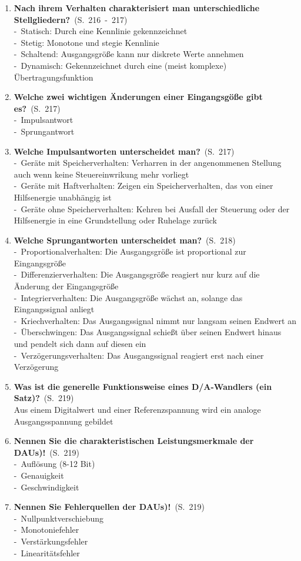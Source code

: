 \documentclass[a4paper,12pt]{article}
\newcommand{\question}[3]{\pagebreak[3]\item {\textbf{#1?}}\ (S.\ #2)#3}
\newcommand{\statement}[3]{\pagebreak[3]\item {\textbf{#1!}}\ (S.\ #2)#3}
\newcommand{\catchword}[1]{\\-\ #1}
\newcommand{\normaltext}[1]{\\#1}
\newcommand{\page}[1]{#1}
\newcommand{\pages}[2]{#1\ -\ #2}
\begin{document}
\begin{enumerate}
  \question{Nach ihrem Verhalten charakterisiert man unterschiedliche Stellgliedern}{\pages{216}{217}}
  {
    \catchword{Statisch: Durch eine Kennlinie gekennzeichnet}
    \catchword{Stetig: Monotone und stegie Kennlinie}
    \catchword{Schaltend: Ausgangsgröße kann nur diskrete Werte annehmen}
    \catchword{Dynamisch: Gekennzeichnet durch eine (meist komplexe) Übertragungsfunktion}
  }

  \question{Welche zwei wichtigen Änderungen einer Eingangsgöße gibt es}{\page{217}}
  {
    \catchword{Impulsantwort}
    \catchword{Sprungantwort}
  }

  \question{Welche Impulsantworten unterscheidet man}{\page{217}}
  {
    \catchword{Geräte mit Speicherverhalten: Verharren in der angenommenen Stellung
               auch wenn keine Steuereinwrikung mehr vorliegt}
    \catchword{Geräte mit Haftverhalten: Zeigen ein Speicherverhalten, das von einer
               Hilfsenergie unabhängig ist}
    \catchword{Geräte ohne Speicherverhalten: Kehren bei Ausfall der Steuerung oder der
               Hilfsenergie in eine Grundstellung oder Ruhelage zurück}
  }

  \question{Welche Sprungantworten unterscheidet man}{\page{218}}
  {
    \catchword{Proportionalverhalten: Die Ausgangsgröße ist proportional zur Eingangsgröße}
    \catchword{Differenzierverhalten: Die Ausgangsgröße reagiert nur kurz auf die Änderung
               der Eingangsgröße}
    \catchword{Integrierverhalten: Die Ausgangsgröße wächst an, solange das Eingangssignal
               anliegt}
    \catchword{Kriechverhalten: Das Ausgangssignal nimmt nur langsam seinen Endwert an}
    \catchword{Überschwingen: Das Ausgangssignal schießt über seinen Endwert hinaus und
               pendelt sich dann auf diesen ein}
    \catchword{Verzögerungsverhalten: Das Ausgangssignal reagiert erst nach einer Verzögerung}
  }

  \question{Was ist die generelle Funktionsweise eines D/A-Wandlers (ein Satz)}{\page{219}}
  {
    \normaltext{Aus einem Digitalwert und einer Referenzspannung wird ein analoge Ausgangsspannung gebildet}
  }

  \statement{Nennen Sie die charakteristischen Leistungsmerkmale der DAUs)}{\page{219}}
  {
    \catchword{Auflösung (8-12 Bit)}
    \catchword{Genauigkeit}
    \catchword{Geschwindigkeit}
  }

  \statement{Nennen Sie Fehlerquellen der DAUs)}{\page{219}}
  {
    \catchword{Nullpunktverschiebung}
    \catchword{Monotoniefehler}
    \catchword{Verstärkungsfehler}
    \catchword{Linearitätsfehler}
  }


\end{enumerate}
\end{document}
